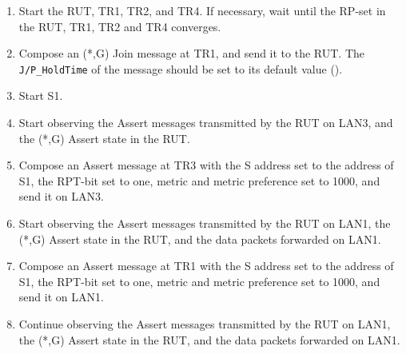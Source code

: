 \documentclass[11pt]{report}
\begin{document}
\begin{enumerate}

  \item Start the RUT, TR1, TR2, and TR4. If necessary, wait until the RP-set
  in the RUT, TR1, TR2 and TR4 converges.

  \item Compose an (*,G) Join message at TR1, and send it to the RUT.
  The \verb=J/P_HoldTime= of the message should be set to its default
  value ({\PimsmJPHoldTime}).

  \item Start S1.

  \item Start observing the Assert messages transmitted by the RUT on
  LAN3, and the (*,G) Assert state in the RUT.

  \item Compose an Assert message at TR3 with the S address set to the
  address of S1, the RPT-bit set to one, metric and metric preference set to
  1000, and send it on LAN3.

  \item Start observing the Assert messages transmitted by the RUT on
  LAN1, the (*,G) Assert state in the RUT, and the data packets forwarded on
  LAN1. 

  \item Compose an Assert message at TR1 with the S address set to the
  address of S1, the RPT-bit set to one, metric and metric preference set to
  1000, and send it on LAN1.

  \item Continue observing the Assert messages transmitted by the RUT on
  LAN1, the (*,G) Assert state in the RUT, and the data packets forwarded on
  LAN1.

\end{enumerate}


\end{document}
